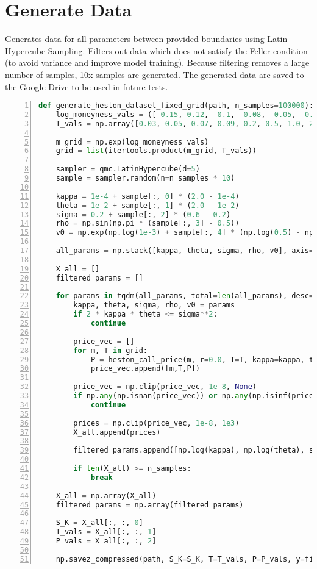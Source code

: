 \documentclass{article}
\begin{document}
\section{Generate Data}
Generates data for all parameters between provided boundaries using Latin Hypercube Sampling. Filters out data which does not satisfy the Feller condition (to avoid variance and improve model training). Because filtering removes a large number of samples, 10x samples are generated. The generated data are saved to the Google Drive to be used in future tests.
\lstset{firstnumber=last}
\begin{lstlisting}[language=Python, caption={Generate Training Data Utilizing Latin Hypercube Sampling}, label={lst:imports}, numbers=left]
def generate_heston_dataset_fixed_grid(path, n_samples=100000):
    log_moneyness_vals = ([-0.15,-0.12, -0.1, -0.08, -0.05, -0.04, -0.03, -0.02, -0.01, 0.0, 0.01, 0.02, 0.03, 0.04, 0.05, 0.07, 0.09, 0.11, 0.13, 0.15, 0.17, 0.19, 0.21])
    T_vals = np.array([0.03, 0.05, 0.07, 0.09, 0.2, 0.5, 1.0, 2.0, 3.0])

    m_grid = np.exp(log_moneyness_vals)
    grid = list(itertools.product(m_grid, T_vals))

    sampler = qmc.LatinHypercube(d=5)
    sample = sampler.random(n=n_samples * 10)

    kappa = 1e-4 + sample[:, 0] * (2.0 - 1e-4)
    theta = 1e-2 + sample[:, 1] * (2.0 - 1e-2)
    sigma = 0.2 + sample[:, 2] * (0.6 - 0.2)
    rho = np.sin(np.pi * (sample[:, 3] - 0.5))
    v0 = np.exp(np.log(1e-3) + sample[:, 4] * (np.log(0.5) - np.log(1e-3)))

    all_params = np.stack([kappa, theta, sigma, rho, v0], axis=1)

    X_all = []
    filtered_params = []

    for params in tqdm(all_params, total=len(all_params), desc="Generating samples"):
        kappa, theta, sigma, rho, v0 = params
        if 2 * kappa * theta <= sigma**2:
            continue

        price_vec = []
        for m, T in grid:
            P = heston_call_price(m, r=0.0, T=T, kappa=kappa, theta=theta, sigma=sigma, rho=rho, v0=v0)
            price_vec.append([m,T,P])

        price_vec = np.clip(price_vec, 1e-8, None)
        if np.any(np.isnan(price_vec)) or np.any(np.isinf(price_vec)):
            continue

        prices = np.clip(price_vec, 1e-8, 1e3)
        X_all.append(prices)

        filtered_params.append([np.log(kappa), np.log(theta), sigma, rho, np.log(v0)])

        if len(X_all) >= n_samples:
            break

    X_all = np.array(X_all)
    filtered_params = np.array(filtered_params)

    S_K = X_all[:, :, 0]
    T_vals = X_all[:, :, 1]
    P_vals = X_all[:, :, 2]

    np.savez_compressed(path, S_K=S_K, T=T_vals, P=P_vals, y=filtered_params)
\end{lstlisting}
\end{document}

